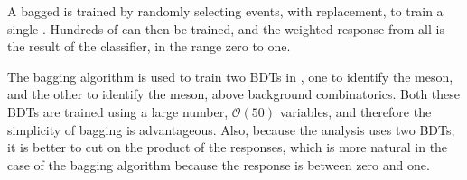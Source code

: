 A bagged \BDT is trained by randomly selecting events, with replacement, to train a single \DT.
Hundreds of \DTs can then be trained, and the weighted response from all \DTs is the result of the
classifier, in the range zero to one.

The bagging algorithm is used to train two \glspl{BDT} in , one to identify the \Ds
meson, and the other to identify the \phii meson, above background combinatorics.
Both these BDTs are trained using a large number, $\mathcal{O}(50)$ variables, and therefore the
simplicity of bagging is advantageous.
Also, because the analysis uses two \glspl{BDT}, it is better to cut on the product of the \BDT
responses, which is more natural in the case of the bagging algorithm because the response is
between zero and one.






